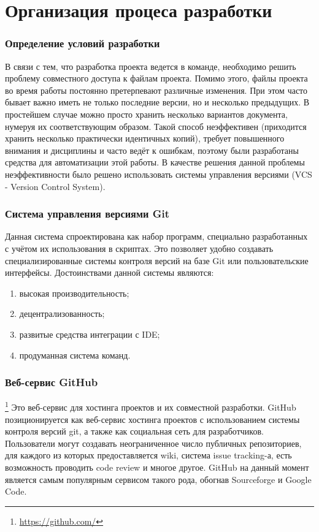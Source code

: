 \newpage
\chapter{Организация процеса разработки}
\subsection{Определение условий разработки}
В связи с тем, что разработка проекта ведется в команде, необходимо решить
проблему совместного доступа к файлам проекта. Помимо этого, файлы проекта во
время работы постоянно претерпевают различные изменения. При этом часто бывает
важно иметь не только последние версии, но и несколько предыдущих. В простейшем
случае можно просто хранить несколько вариантов документа, нумеруя их
соответствующим образом. Такой способ неэффективен (приходится хранить несколько
практически идентичных копий), требует повышенного внимания и дисциплины и часто
ведёт к ошибкам, поэтому были разработаны средства для автоматизации этой
работы. В качестве решения данной проблемы неэффективности было решено
использовать системы управления версиями (VCS -  Version Control System).

\subsection{Система управления версиями Git}
Данная система  спроектирована как набор программ, специально разработанных с
учётом их использования в скриптах. Это позволяет удобно создавать
специализированные системы контроля версий на базе Git или пользовательские
интерфейсы.
Достоинствами данной системы являются:
\begin{enumerate}
  \item высокая производительность;
  \item децентрализованность;
  \item развитые средства интеграции с IDE;
  \item продуманная система команд.
\end{enumerate}

\subsection{Веб-сервис GitHub}\footnote{
	\url{https://github.com/}
} 
Это веб-сервис для хостинга проектов и их совместной разработки. GitHub
позиционируется как веб-сервис хостинга проектов с использованием системы
контроля версий git, а также как социальная сеть для разработчиков. Пользователи
могут создавать неограниченное число публичных репозиториев, для каждого из
которых предоставляется wiki, система issue tracking-а, есть возможность
проводить code review и многое другое. GitHub на данный момент является самым
популярным сервисом такого рода, обогнав Sourceforge и Google Code.

